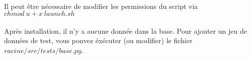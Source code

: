 \documentclass[10pt,a4paper]{article}
\begin{document}
\paragraph{}
\begin{small}
Il peut \^{e}tre nécessaire de modifier les permissions du script via $chmod \ u+x\ launch.sh$
\end{small}
\paragraph{}Après installation, il n'y a aucune donnée dans la base. Pour ajouter un jeu de données de test, vous pouvez éxécuter (ou modifier) le fichier $racine/src/tests/base.py$.
\end{document}
